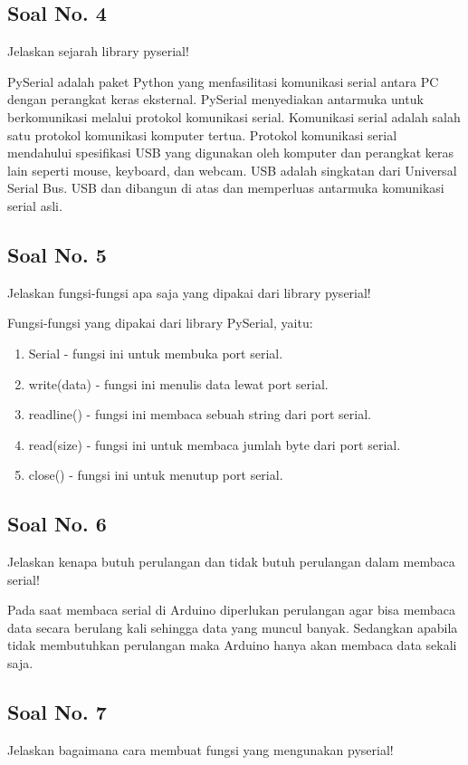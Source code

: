 


\subsection{Soal No. 4}
Jelaskan sejarah library pyserial!

\hfill \break
PySerial adalah paket Python yang menfasilitasi komunikasi serial antara PC dengan perangkat keras eksternal. PySerial menyediakan antarmuka untuk berkomunikasi melalui protokol komunikasi serial. Komunikasi serial adalah salah satu protokol komunikasi komputer tertua. Protokol komunikasi serial mendahului spesifikasi USB yang digunakan oleh komputer dan perangkat keras lain seperti mouse, keyboard, dan webcam. USB adalah singkatan dari Universal Serial Bus. USB dan dibangun di atas dan memperluas antarmuka komunikasi serial asli.

\subsection{Soal No. 5}
Jelaskan fungsi-fungsi apa saja yang dipakai dari library pyserial!

\hfill \break
Fungsi-fungsi yang dipakai dari library PySerial, yaitu:
\begin{enumerate}
	\item Serial - fungsi ini untuk membuka port serial.
	\item write(data) - fungsi ini menulis data lewat port serial.
	\item readline() - fungsi ini membaca sebuah string dari port serial.
	\item read(size) - fungsi ini untuk membaca jumlah byte dari port serial.
	\item close() - fungsi ini untuk menutup port serial.
\end{enumerate}

\subsection{Soal No. 6}
Jelaskan kenapa butuh perulangan dan tidak butuh perulangan dalam membaca serial!

\hfill \break
Pada saat membaca serial di Arduino diperlukan perulangan agar bisa membaca data secara berulang kali sehingga data yang muncul banyak. Sedangkan apabila tidak membutuhkan perulangan maka Arduino hanya akan membaca data sekali saja.

\subsection{Soal No. 7}
Jelaskan bagaimana cara membuat fungsi yang mengunakan pyserial!

